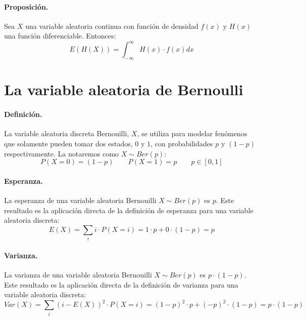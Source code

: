 \paragraph{Proposici\'on.} Sea $X$ una variable aleatoria continua con
funci\'on de densidad $f(x)$ y $H(x)$ una funci\'on diferenciable. Entonces:
\begin{displaymath}
E(H(X)) = \int_{-\infty}^{\infty} H(x) \cdot f(x) dx
\end{displaymath}



\section{La variable aleatoria de Bernoulli}

\paragraph{Definici\'on.} La variable aleatoria discreta Bernouilli, $X$, se 
utiliza para modelar fen\'omenos que solamente pueden tomar dos estados, 
$0$ y $1$, con probabilidades $p$ y $(1-p)$ respectivamente. La notaremos 
como $X \sim Ber(p)$:
\begin{displaymath}
P(X=0) = (1 - p) \qquad   P(X=1) = p \qquad p \in [0,1]
\end{displaymath}
 
\paragraph{Esperanza.} La esperanza de una variable aleatoria Bernouilli $X \sim Ber(p)$ 
es $p$. Este resultado es la aplicaci\'on directa de la definici\'on de esperanza 
para una variable aleatoria discreta:
\begin{displaymath}
E(X) = \sum_{i} i \cdot P(X=i) = 1 \cdot p + 0 \cdot (1-p) = p
\end{displaymath}

\paragraph{Varianza.} La varianza de una variable aleatoria Bernouilli $X \sim Ber(p)$ 
es $p \cdot (1-p)$. Este resultado es la aplicaci\'on directa de la definici\'on 
de varianza para una variable aleatoria discreta:
\begin{displaymath}
Var(X)= \sum_{i} (i-E(X))^2 \cdot P(X=i) = (1-p)^2 \cdot p + (-p)^2 \cdot (1-p) = p \cdot (1-p)
\end{displaymath}
 
